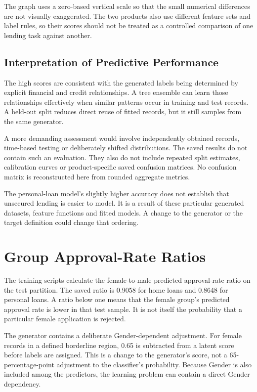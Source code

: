 The graph uses a zero-based vertical scale so that the small numerical differences are not visually exaggerated. The two products also use different feature sets and label rules, so their scores should not be treated as a controlled comparison of one lending task against another.

\subsection{Interpretation of Predictive Performance}
The high scores are consistent with the generated labels being determined by explicit financial and credit relationships. A tree ensemble can learn those relationships effectively when similar patterns occur in training and test records. A held-out split reduces direct reuse of fitted records, but it still samples from the same generator.

A more demanding assessment would involve independently obtained records, time-based testing or deliberately shifted distributions. The saved results do not contain such an evaluation. They also do not include repeated split estimates, calibration curves or product-specific saved confusion matrices. No confusion matrix is reconstructed here from rounded aggregate metrics.

The personal-loan model's slightly higher accuracy does not establish that unsecured lending is easier to model. It is a result of these particular generated datasets, feature functions and fitted models. A change to the generator or the target definition could change that ordering.

\section{Group Approval-Rate Ratios}
The training scripts calculate the female-to-male predicted approval-rate ratio on the test partition. The saved ratio is 0.9058 for home loans and 0.8648 for personal loans. A ratio below one means that the female group's predicted approval rate is lower in that test sample. It is not itself the probability that a particular female application is rejected.

The generator contains a deliberate Gender-dependent adjustment. For female records in a defined borderline region, 0.65 is subtracted from a latent score before labels are assigned. This is a change to the generator's score, not a 65-percentage-point adjustment to the classifier's probability. Because Gender is also included among the predictors, the learning problem can contain a direct Gender dependency.

